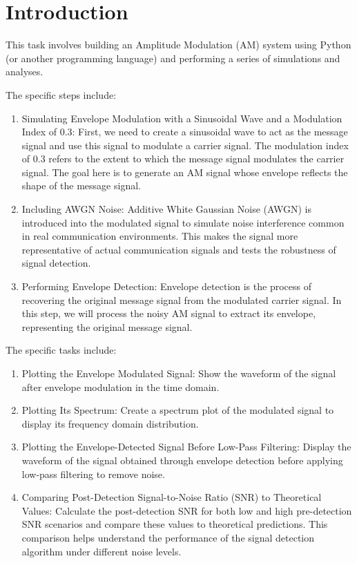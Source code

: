 \documentclass[../ECE459FinalProjectReport.tex]{subfiles}
\begin{document}
\chapter{Introduction}
This task involves building an Amplitude Modulation (AM) system using Python (or another programming language) and performing a series of simulations and analyses. 

The specific steps include:

\begin{enumerate}
    \item Simulating Envelope Modulation with a Sinusoidal Wave and a Modulation Index of 0.3: First, we need to create a sinusoidal wave to act as the message signal and use this signal to modulate a carrier signal. The modulation index of 0.3 refers to the extent to which the message signal modulates the carrier signal. The goal here is to generate an AM signal whose envelope reflects the shape of the message signal.
    \item Including AWGN Noise: Additive White Gaussian Noise (AWGN) is introduced into the modulated signal to simulate noise interference common in real communication environments. This makes the signal more representative of actual communication signals and tests the robustness of signal detection.
    \item Performing Envelope Detection: Envelope detection is the process of recovering the original message signal from the modulated carrier signal. In this step, we will process the noisy AM signal to extract its envelope, representing the original message signal.
\end{enumerate}

The specific tasks include:

\begin{enumerate}
    \item Plotting the Envelope Modulated Signal: Show the waveform of the signal after envelope modulation in the time domain.
    \item Plotting Its Spectrum: Create a spectrum plot of the modulated signal to display its frequency domain distribution.
    \item Plotting the Envelope-Detected Signal Before Low-Pass Filtering: Display the waveform of the signal obtained through envelope detection before applying low-pass filtering to remove noise.
    \item  Comparing Post-Detection Signal-to-Noise Ratio (SNR) to Theoretical Values: Calculate the post-detection SNR for both low and high pre-detection SNR scenarios and compare these values to theoretical predictions. This comparison helps understand the performance of the signal detection algorithm under different noise levels.
\end{enumerate}
\end{document}
